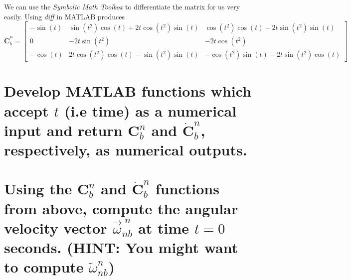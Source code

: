 \documentclass[12pt,letterpaper, onecolumn]{exam}
\begin{document}
\begin{questions}
\begin{parts}
        We can use the \textit{Symbolic Math Toolbox} to differentiate the matrix for us very easily. Using \textit{diff} in MATLAB produces
        \[ \dot{\mathbf{C}}^n_b = \left[\begin{array}{ccc} -\sin\left(t\right) & \sin\left(t^2\right)\cos\left(t\right)+2t\cos\left(t^2\right)\sin\left(t\right) & \cos\left(t^2\right)\cos\left(t\right)-2t\sin\left(t^2\right)\sin\left(t\right)\\ 0 & -2t\sin\left(t^2\right) & -2t\cos\left(t^2\right)\\ -\cos\left(t\right) & 2t\cos\left(t^2\right)\cos\left(t\right)-\sin\left(t^2\right)\sin\left(t\right) & -\cos\left(t^2\right)\sin\left(t\right)-2t\sin\left(t^2\right)\cos\left(t\right) \end{array}\right]\]



        \part{Develop MATLAB functions which accept $t$ (i.e time) as a numerical input and return $\mathbf{C}^n_b$ and $\dot{\mathbf{C}}^n_b$, respectively, as numerical outputs.}


        \part{Using the $\mathbf{C}^n_b$ and $\dot{\mathbf{C}}^n_b$ functions from above, compute the angular velocity vector $\vec{\omega}^{\;n}_{nb}$ at time $t = 0$ seconds. (HINT: You might want to compute $\tilde{\omega}^{n}_{nb}$)}


\end{parts}
\end{questions}
\end{document}

